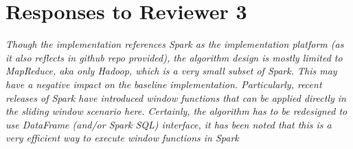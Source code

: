 \section{Responses to Reviewer 3}
\emph{Though the implementation references Spark as the implementation
platform (as it also reflects in github repo provided), the algorithm design is
mostly limited to MapReduce, aka only Hadoop, which is a very small subset of
Spark. This may have a negative impact on the baseline implementation.
Particularly, recent releases of Spark have introduced window functions that can
be applied directly in the sliding window scenario here. Certainly, the algorithm
has to be redesigned to use DataFrame (and/or Spark SQL) interface, it has
been noted that this is a very efficient way to execute window functions in
Spark}

